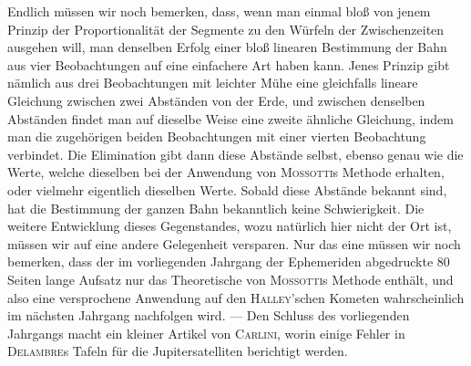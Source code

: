 Endlich müssen wir noch bemerken, dass, wenn man einmal bloß von jenem Prinzip der Proportionalität der Segmente zu den Würfeln der Zwischenzeiten ausgehen will, man denselben Erfolg einer bloß linearen Bestimmung der Bahn aus vier Beobachtungen auf eine einfachere Art haben kann. Jenes Prinzip gibt nämlich aus drei Beobachtungen mit leichter Mühe eine gleichfalls lineare Gleichung zwischen zwei Abständen von der Erde, und zwischen denselben Abständen findet man auf dieselbe Weise eine zweite ähnliche Gleichung, indem man die zugehörigen beiden Beobachtungen mit einer vierten Beobachtung verbindet. Die Elimination gibt dann diese Abstände selbst, ebenso genau wie die Werte, welche dieselben bei der Anwendung von \textsc{Mossotti}s Methode erhalten, oder vielmehr eigentlich dieselben Werte. Sobald diese Abstände bekannt sind, hat die Bestimmung der ganzen Bahn bekanntlich keine Schwierigkeit. Die weitere Entwicklung dieses Gegenstandes, wozu natürlich hier nicht der Ort ist, müssen wir auf eine andere Gelegenheit versparen. Nur das eine müssen wir noch bemerken, dass der im vorliegenden Jahrgang der Ephemeriden abgedruckte 80 Seiten lange Aufsatz nur das Theoretische von \textsc{Mossotti}s Methode enthält, und also eine versprochene Anwendung auf den \textsc{Halley}’schen Kometen wahrscheinlich im nächsten Jahrgang nachfolgen wird. --- Den Schluss des vorliegenden Jahrgangs macht ein kleiner Artikel von \textsc{Carlini}, worin einige Fehler in \textsc{Delambre}s Tafeln für die Jupitersatelliten berichtigt werden.
\par\clearpage\endgroup
